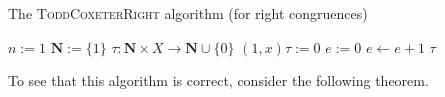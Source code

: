 \begin{algorithm}
\caption{The \textsc{ToddCoxeterRight} algorithm (for right congruences)}
\label{alg:tc-right}
\begin{algorithmic}[1]
\State $n := 1$
\State $\mathbf{N} := \{1\}$
\State $\tau : \mathbf{N} \times X \to \mathbf{N} \cup \{0\}$
  \State $(1, x)\tau := 0$
\EndFor
{}
  \State {}
\EndFor
\State $e := 0$
\Repeat
  \State $e \gets e + 1$
      \State {}
    \EndFor
  \EndIf
{}  
\State \Return $\tau$
\EndProcedure
\end{algorithmic}
\end{algorithm}

To see that this algorithm is correct, consider the following theorem.

